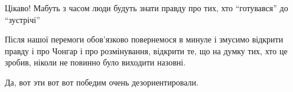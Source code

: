  
 
 
 
 

\qqSecCmt


Цікаво! Мабуть з часом люди будуть знати правду про тих, хто \enquote{готувався} до \enquote{зустрічі}


Після нашої перемоги обов'язково повернемося в минуле і змусимо відкрити правду
і про Чонгар і про розмінування, відкрити те, що на думку тих, хто це зробив,
ніколи не повинно було виходити назовні.


Да, вот эти вот вот победим очень дезориентировали.
